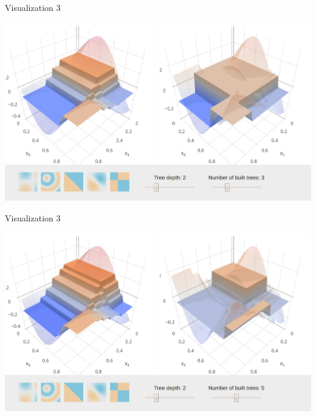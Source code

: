 
\begin{vbframe}{Visualization 3}

\begin{center}
\includegraphics[width=\textwidth]{figure_man/gbm_anim/gbm3.jpg}
\href{http://arogozhnikov.github.io/2016/06/24/gradient_boosting_explained.html}{}
\end{center}
\addtocounter{framenumber}{-1}

\end{vbframe}



\begin{vbframe}{Visualization 3}

\begin{center}
\includegraphics[width=\textwidth]{figure_man/gbm_anim/gbm5.jpg}
\href{http://arogozhnikov.github.io/2016/06/24/gradient_boosting_explained.html}{}
\end{center}
\addtocounter{framenumber}{-1}

\end{vbframe}

